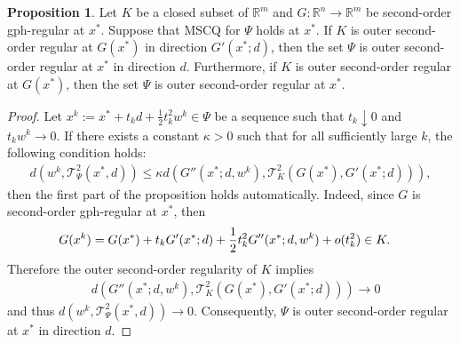 \documentclass[11pt]{article}
\theoremstyle{definition}
\newtheorem{proposition}[theorem]{Proposition}
\theoremstyle{remark}
\numberwithin{equation}{section}
\begin{document}
\begin{proposition}\label{prop G^-1(K) second order regular}
  Let $K$ be a closed subset of $\mathbb{R}^m$ and $G:\mathbb{R}^n\to \mathbb{R}^m$ be  
   second-order gph-regular at $x^*$. Suppose
  that MSCQ for $\Psi$ holds at $x^*$. If $K$ is outer second-order regular at $G(x^*)$ in direction
  $G'(x^*;d)$, then the set $\Psi$ is outer second-order regular at $x^*$ in direction $d$. Furthermore,
  if $K$ is outer second-order regular at $G(x^*)$, then the set $\Psi$ is outer second-order regular at $x^*$.
\end{proposition}
\begin{proof}
  Let $x^k:=x^*+t_k d+\frac{1}{2}t_k^2w^k\in \Psi$ be a sequence such that $t_k\downarrow 0$ and $t_k w^k\to 0$.
 If there exists a constant $\kappa>0$ such that for all sufficiently large $k$,   the  following condition holds:
\begin{align}\label{d(w^k,T^2)}
  d\left(w^k, \mathcal{T}^2_{\Psi}(x^*,d)\right)\le \kappa d\left(G''(x^*;d,w^k),
  \mathcal{T}_{K}^2\left(G(x^*),G'(x^*;d)\right)\right),
\end{align}
 then the first part of the proposition holds automatically.
Indeed,  since $G$ is second-order gph-regular at  $x^*$, then
\begin{align}%
   & G(x^k)=G(x^*)+t_k G'(x^*;d)+\frac{1}{2}t_k^2G''(x^*;d,w^k)+o(t_k^2)\in K.\notag
\end{align}
Therefore the outer second-order regularity of $K$ implies
\begin{align*}
   & d\left(G''(x^*;d,w^k), \mathcal{T}_{K}^2\left(G(x^*),G'(x^*;d)\right)\right)\to 0
\end{align*}
and thus $ d\left(w^k, \mathcal{T}^2_{\Psi}(x^*,d)\right)\to 0$. Consequently, $\Psi$ is outer
second-order regular at $x^*$ in direction $d$.


\end{proof}
\end{document}
